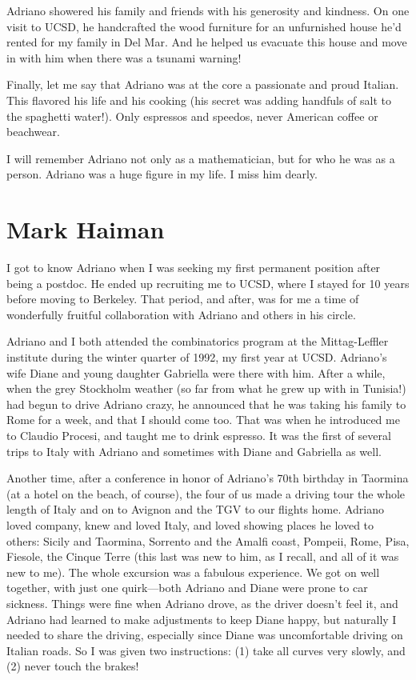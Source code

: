 \documentclass{notices}
\begin{document}
Adriano showered his family and friends with his generosity and kindness. On one visit to UCSD, he handcrafted the wood furniture for an unfurnished house he'd rented for my family in Del Mar. And he helped us evacuate this house and move in with him when there was a tsunami warning! 
 
Finally, let me say that Adriano was at the core a passionate and proud Italian. This flavored his life and his cooking (his secret was adding handfuls of salt to the spaghetti water!).  Only espressos and speedos, never American coffee or beachwear.
 
I will remember Adriano not only as a mathematician, but for who he was as a person. Adriano was a huge figure in my life. I miss him dearly.

\section*{Mark Haiman}
I got to know Adriano when I was seeking my first permanent position after being a postdoc.  He ended up recruiting me to UCSD, where I stayed for 10 years before moving to Berkeley.  That period, and after, was for me a time of wonderfully fruitful collaboration with Adriano and others in his circle.

Adriano and I both attended the combinatorics program at the Mittag-Leffler institute during the winter quarter of 1992, my first year at UCSD.   Adriano's wife Diane and young daughter Gabriella were there with him.  After a while, when the grey Stockholm weather (so far from what he grew up with in Tunisia!) had begun to drive Adriano crazy, he announced that he was taking his family to Rome for a week, and that I should come too.  That was when he introduced me to Claudio Procesi, and taught me to drink espresso.  It was the first of several trips to Italy with Adriano and sometimes with Diane and Gabriella as well.

Another time, after a conference in honor of Adriano's 70th birthday in Taormina (at a hotel on the beach, of course), the four of us made a driving tour the whole length of Italy and on to Avignon and the TGV to our flights home.  Adriano loved company, knew and loved Italy, and loved showing places he loved to others: Sicily and Taormina, Sorrento and the Amalfi coast, Pompeii, Rome, Pisa, Fiesole, the Cinque Terre (this last was new to him, as I recall, and all of it was new to me).  The whole excursion was a fabulous experience.  We got on well together, with just one quirk---both Adriano and Diane were prone to car sickness.  Things were fine when Adriano drove, as the driver doesn't feel it, and Adriano had learned to make adjustments to keep Diane happy, but naturally I needed to share the driving, especially since Diane was uncomfortable driving on Italian roads.  So I was given two instructions: (1) take all curves very slowly, and (2) never touch the brakes!
\end{document}
